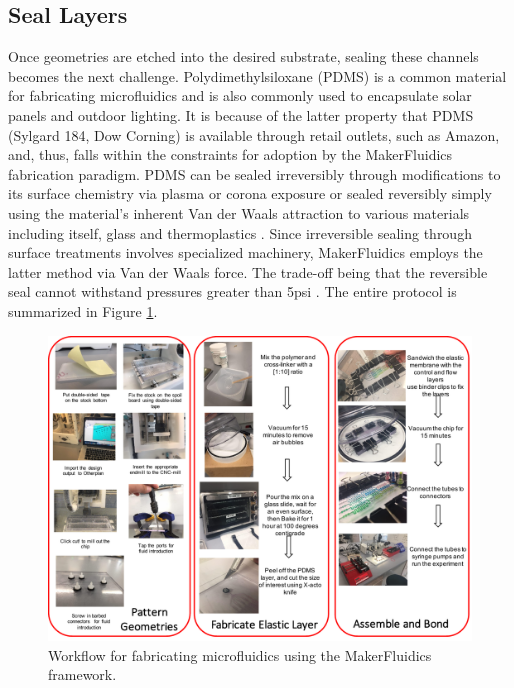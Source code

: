 \subsection{Seal Layers}
Once geometries are etched into the desired substrate, sealing these channels becomes the next challenge. Polydimethylsiloxane (PDMS) is a common material for fabricating microfluidics \cite{mcdonald2002poly} and is also commonly used to encapsulate solar panels and outdoor lighting. It is because of the latter property that PDMS (Sylgard 184, Dow Corning) is available through retail outlets, such as Amazon, and, thus, falls within the constraints for adoption by the MakerFluidics fabrication paradigm. PDMS can be sealed irreversibly through modifications to its surface chemistry via plasma or corona exposure or sealed reversibly simply using the material's inherent Van der Waals attraction to various materials including itself, glass and thermoplastics \cite{mcdonald2002poly}. Since irreversible sealing through surface treatments involves specialized machinery, MakerFluidics employs the latter method via Van der Waals force. The trade-off being that the reversible seal cannot withstand pressures greater than 5psi \cite{mcdonald2002poly}. The entire protocol is summarized in Figure \ref{fig:fabFlow}.


\begin{figure}[h]
  \begin{minipage}[t]{0.99\linewidth}\centering
    \includegraphics[width=14cm]{fabFlow.pdf}
    \medskip
  \end{minipage}\hfill
  \caption[The MakerFluidics fabrication protocol]{Workflow for fabricating microfluidics using the MakerFluidics framework.}
    \label{fig:fabFlow}
\end{figure}




